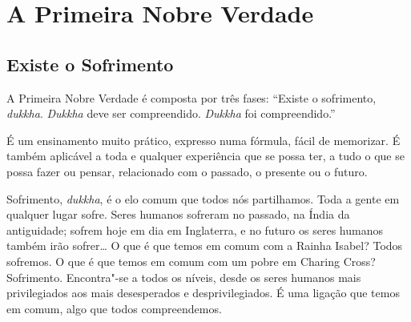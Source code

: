 
\chapter{A Primeira Nobre Verdade}

\section{Existe o Sofrimento}

A Primeira Nobre Verdade é composta por três fases: “Existe o sofrimento,
\emph{dukkha}. \emph{Dukkha} deve ser compreendido. \emph{Dukkha} foi
compreendido.”

É um ensinamento muito prático, expresso numa fórmula, fácil de memorizar. É
também aplicável a toda e qualquer experiência que se possa ter, a tudo o que se
possa fazer ou pensar, relacionado com o passado, o presente ou o futuro.

Sofrimento, \emph{dukkha}, é o elo comum que todos nós partilhamos. Toda a gente
em qualquer lugar sofre. Seres humanos sofreram no passado, na Índia da
antiguidade; sofrem hoje em dia em Inglaterra, e no futuro os seres humanos
também irão sofrer\ldots{} O que é que temos em comum com a Rainha Isabel?
Todos sofremos. O que é que temos em comum com um pobre em Charing Cross?
Sofrimento. Encontra"-se a todos os níveis, desde os seres humanos mais
privilegiados aos mais desesperados e desprivilegiados. É uma ligação que temos
em comum, algo que todos compreendemos.


